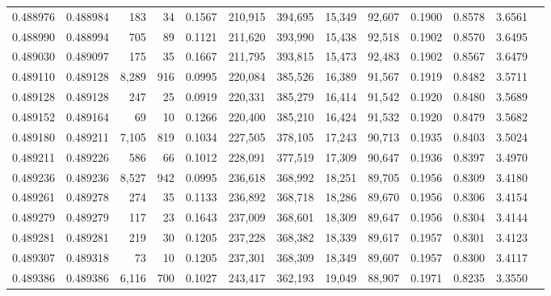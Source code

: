 \begin{tabular}{rrrrrrrrrrrrr}
0.488976 & 0.488984 &   183 &    34 &                                     0.1567 & 210,915 & 394,695 &  15,349 &  92,607 & 0.1900 & 0.8578 & 3.6561 \\
0.488990 & 0.488994 &   705 &    89 &                                     0.1121 & 211,620 & 393,990 &  15,438 &  92,518 & 0.1902 & 0.8570 & 3.6495 \\
0.489030 & 0.489097 &   175 &    35 &                                     0.1667 & 211,795 & 393,815 &  15,473 &  92,483 & 0.1902 & 0.8567 & 3.6479 \\
0.489110 & 0.489128 & 8,289 &   916 &                                     0.0995 & 220,084 & 385,526 &  16,389 &  91,567 & 0.1919 & 0.8482 & 3.5711 \\
0.489128 & 0.489128 &   247 &    25 &                                     0.0919 & 220,331 & 385,279 &  16,414 &  91,542 & 0.1920 & 0.8480 & 3.5689 \\
0.489152 & 0.489164 &    69 &    10 &                                     0.1266 & 220,400 & 385,210 &  16,424 &  91,532 & 0.1920 & 0.8479 & 3.5682 \\
0.489180 & 0.489211 & 7,105 &   819 &                                     0.1034 & 227,505 & 378,105 &  17,243 &  90,713 & 0.1935 & 0.8403 & 3.5024 \\
0.489211 & 0.489226 &   586 &    66 &                                     0.1012 & 228,091 & 377,519 &  17,309 &  90,647 & 0.1936 & 0.8397 & 3.4970 \\
0.489236 & 0.489236 & 8,527 &   942 &                                     0.0995 & 236,618 & 368,992 &  18,251 &  89,705 & 0.1956 & 0.8309 & 3.4180 \\
0.489261 & 0.489278 &   274 &    35 &                                     0.1133 & 236,892 & 368,718 &  18,286 &  89,670 & 0.1956 & 0.8306 & 3.4154 \\
0.489279 & 0.489279 &   117 &    23 &                                     0.1643 & 237,009 & 368,601 &  18,309 &  89,647 & 0.1956 & 0.8304 & 3.4144 \\
0.489281 & 0.489281 &   219 &    30 &                                     0.1205 & 237,228 & 368,382 &  18,339 &  89,617 & 0.1957 & 0.8301 & 3.4123 \\
0.489307 & 0.489318 &    73 &    10 &                                     0.1205 & 237,301 & 368,309 &  18,349 &  89,607 & 0.1957 & 0.8300 & 3.4117 \\
0.489386 & 0.489386 & 6,116 &   700 &                                     0.1027 & 243,417 & 362,193 &  19,049 &  88,907 & 0.1971 & 0.8235 & 3.3550 \\

\end{tabular}
